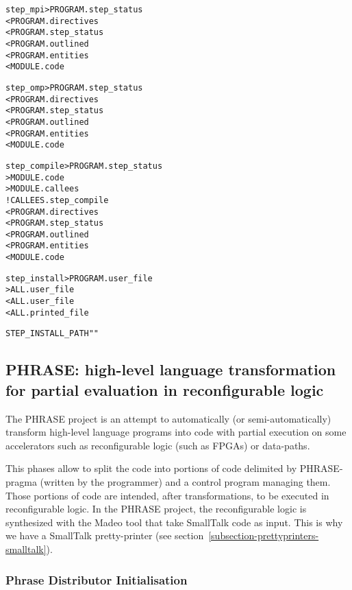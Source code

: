 \documentclass[a4paper]{report}
\newenvironment{PipsProp}{\begin{alltt}}{\end{alltt}}
\newenvironment{PipsMake}{\begin{alltt}}{\end{alltt}}
\begin{document}
\begin{PipsMake}
step_mpi                   > PROGRAM.step_status
   < PROGRAM.directives
   < PROGRAM.step_status
   < PROGRAM.outlined
   < PROGRAM.entities
   < MODULE.code

step_omp                   > PROGRAM.step_status
   < PROGRAM.directives
   < PROGRAM.step_status
   < PROGRAM.outlined
   < PROGRAM.entities
   < MODULE.code

step_compile               > PROGRAM.step_status
                           > MODULE.code
                           > MODULE.callees
   ! CALLEES.step_compile
   < PROGRAM.directives
   < PROGRAM.step_status
   < PROGRAM.outlined
   < PROGRAM.entities
   < MODULE.code

step_install               > PROGRAM.user_file
                           > ALL.user_file
   < ALL.user_file
   < ALL.printed_file
\end{PipsMake}

\begin{PipsProp}
STEP_INSTALL_PATH ""
\end{PipsProp}


\subsection{PHRASE: high-level language transformation for partial evaluation in reconfigurable logic}
\label{subsubsection-phrase-code-distribution}

The PHRASE project is an attempt to automatically (or semi-automatically)
transform high-level language programs into code with partial execution on
some accelerators such as reconfigurable logic (such as FPGAs) or
data-paths.

This phases allow to split the code into portions of code delimited by
PHRASE-pragma (written by the programmer) and a control program managing
them. Those portions of code are intended, after transformations, to be
executed in reconfigurable logic. In the PHRASE project, the
reconfigurable logic is synthesized with the Madeo tool that take
SmallTalk code as input. This is why we have a SmallTalk pretty-printer
(see section~\ref{subsection-prettyprinters-smalltalk}).


\subsubsection{Phrase Distributor Initialisation}
\end{document}
